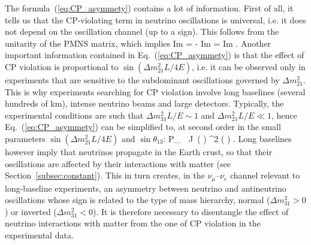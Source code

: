 The formula~(\ref{eq:CP_asymmety}) contains a lot of information. First of all, it tells us
that the CP-violating term in neutrino oscillations is universal, i.e. it does not depend
on the oscillation channel (up to a sign). This follows from the unitarity of the PMNS
matrix, which implies
%
\bea
  \mbox{Im} \left[ U_{e 1} U^*_{\mu 1} U^*_{e 2} U_{\mu 2} \right]
    = - \mbox{Im} 
    = \mbox{Im}  .
\eea
%
Another important information contained in Eq.~(\ref{eq:CP_asymmety}) is that
the effect of CP violation is proportional to $\sin ( \Delta m^2_{21} L / 4 E )$,
i.e. it can be observed only in experiments that are sensitive to the subdominant
oscillations governed by $\Delta m^2_{21}$. This is why experiments searching
for CP violation involve long baselines (several hundreds of km),
intense neutrino beams and large detectors.
Typically, the experimental conditions are such that $\Delta m^2_{31} L / E \sim 1$
and $\Delta m^2_{21} L / E \ll 1$, hence Eq.~(\ref{eq:CP_asymmety}) can be simplified to,
at second order in the small parameters $\sin \left( \Delta m^2_{21} L / 4 E \right)$ and $\sin \theta_{13}$:
%
\be
  \Delta P_{\alpha \beta}\, \simeq\,  J\,
    \sin \left(  \right) \sin^2 \left(  \right) .
\label{eq:CP_asymmety_approx}
\eeq
%
Long baselines however imply that neutrinos propagate in the Earth crust, so that
their oscillations are affected by their interactions with matter (see Section~\ref{subsec:constant}).
This in turn creates, in the $\nu_\mu$--$\nu_e$ channel relevant to long-baseline experiments,
an asymmetry between neutrino and antineutrino oscillations
whose sign is related to the type of mass hierarchy,
normal ($\Delta m^2_{31} > 0$) or inverted ($\Delta m^2_{31} < 0$).
It is therefore necessary to disentangle the effect of neutrino interactions with matter
from the one of CP violation in the experimental data.


